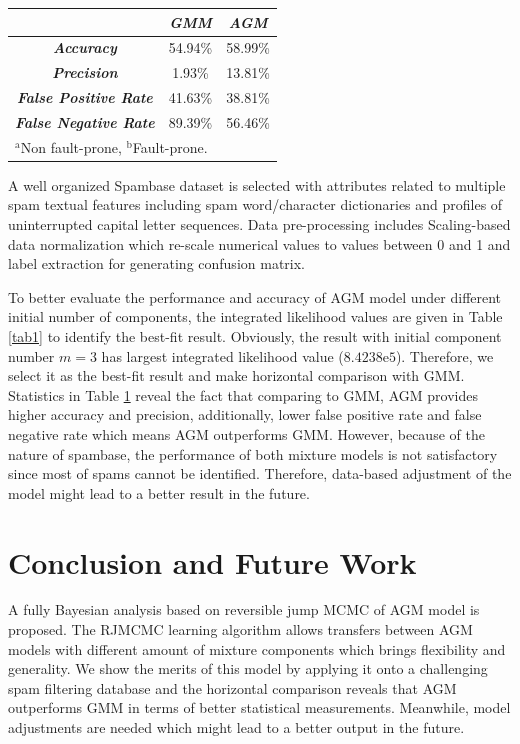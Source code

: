 \documentclass[conference]{IEEEtran}
\begin{document}
\begin{table}[b]
\begin{center}
\begin{tabular}{|c|c|c|}
\hline
 & \multicolumn{1}{|p{1.5cm}|}{\centering \textbf{\textit{GMM}}} & \multicolumn{1}{|p{1.5cm}|}{\centering \textbf{\textit{AGM}}}\\
\hline
\multicolumn{1}{|p{2.5cm}|}{\centering \textbf{\textit{Accuracy}}}  & 54.94\% & 58.99\%\\
\multicolumn{1}{|p{2.5cm}|}{\centering \textbf{\textit{Precision}}} & 1.93\% & 13.81\%\\
\multicolumn{1}{|p{2.5cm}|}{\centering \textbf{\textit{False Positive Rate}}}  & 41.63\% & 38.81\%\\
\multicolumn{1}{|p{2.5cm}|}{\centering \textbf{\textit{False Negative Rate}}} & 89.39\% & 56.46\%\\
\hline
\multicolumn{3}{l}{$^{\mathrm{a}}$Non fault-prone, $^{\mathrm{b}}$Fault-prone.}
\end{tabular}
\end{center}
\label{tab2}
\end{table}

A well organized Spambase dataset\cite{spambase} is selected with attributes related to multiple spam textual features including spam word/character dictionaries and profiles of uninterrupted capital letter sequences. Data pre-processing includes Scaling-based data normalization which re-scale numerical values to values between 0 and 1 and label extraction for generating confusion matrix. 

To better evaluate the performance and accuracy of AGM model under different initial number of components, the integrated likelihood\cite{b4} values are given in Table \ref{tab1} to identify the best-fit result. Obviously, the result with initial component number $m=3$ has largest integrated likelihood value ($8.4238\mathrm{e}{5}$). Therefore, we select it as the best-fit result and make horizontal comparison with GMM. Statistics in Table \ref{tab2} reveal the fact that comparing to GMM, AGM provides higher accuracy and precision, additionally, lower false positive rate and false negative rate which means AGM outperforms GMM. However, because of the nature of spambase, the performance of both mixture models is not satisfactory since most of spams cannot be identified. Therefore, data-based adjustment of the model might lead to a better result in the future. 

\section{Conclusion and Future Work}
A fully Bayesian analysis based on reversible jump MCMC of AGM model is proposed. The RJMCMC learning algorithm allows transfers between AGM models with different amount of mixture components which brings flexibility and generality. We show the merits of this model by applying it onto a challenging spam filtering database and the horizontal comparison reveals that AGM outperforms GMM in terms of better statistical measurements. Meanwhile, model adjustments are needed which might lead to a better output in the future.
\end{document}
